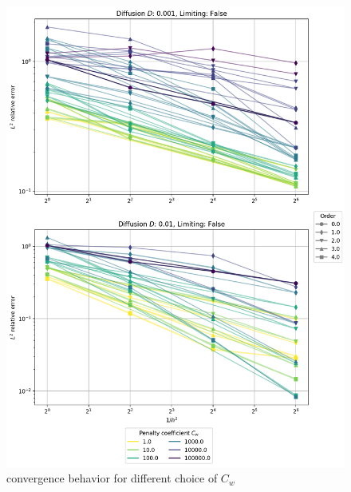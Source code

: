 \begin{figure}[p!]
	\centering
	\includegraphics[width=\textwidth]{../figs/parametric/burgers_1D/_convergences_allunlimited}
	\caption{ convergence behavior for different choice of $C_w$}
	\label{fig:burgess_conv}
\end{figure}
\clearpage




